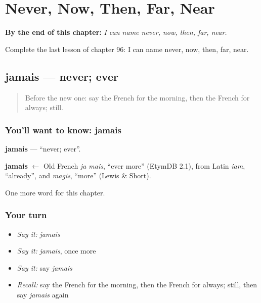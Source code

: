 
\chapter{Never, Now, Then, Far, Near}
\label{ch:fr-never-now-then-far-near}

\begin{chapteropening}
\textbf{By the end of this chapter:} \emph{I can name never, now, then, far, near.}

Complete the last lesson of chapter 96: I can name never, now, then, far, near.
\end{chapteropening}

\section[jamais]{jamais — never; ever}

\label{lesson:FR-C96-jamais}



\begin{quote}
Before the new one: say the French for the morning, then the French for always; still.
\end{quote}

\subsection*{You'll want to know: jamais}
\textbf{jamais} — \textquotedblleft{}never; ever\textquotedblright{}.

\begin{cousinweb}
\textbf{jamais} $\leftarrow$ Old French \emph{ja mais}, \textquotedblleft{}ever more\textquotedblright{} (EtymDB 2.1), from Latin \emph{iam}, \textquotedblleft{}already\textquotedblright{}, and \emph{magis}, \textquotedblleft{}more\textquotedblright{} (Lewis \& Short).
\end{cousinweb}

\begin{grammarlens}[title={What you've built}]
One more word for this chapter.
\end{grammarlens}

\subsection*{Your turn}
\begin{itemize}
\raggedright
  \item \emph{Say it:} \emph{jamais}
  \item \emph{Say it:} \emph{jamais}, once more
  \item \emph{Say it:} say \emph{jamais}
  \item \emph{Recall:} say the French for the morning, then the French for always; still, then say \emph{jamais} again
\end{itemize}


